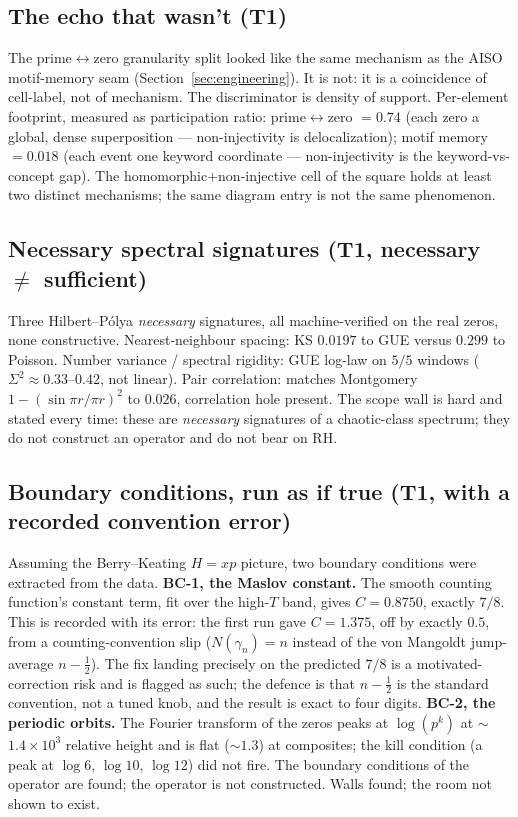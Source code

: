 \documentclass[11pt,a4paper]{article}
\newcommand{\TT}{\textsf{T1}}
\theoremstyle{definition}
\theoremstyle{plain}
\begin{document}
\subsection{The echo that wasn't (\TT)}
The prime$\leftrightarrow$zero granularity split looked like the same mechanism as the AISO
motif-memory seam (Section~\ref{sec:engineering}). It is not: it is a coincidence of cell-label,
not of mechanism. The discriminator is density of support. Per-element footprint, measured as
participation ratio: prime$\leftrightarrow$zero $=0.74$ (each zero a global, dense superposition ---
non-injectivity is delocalization); motif memory $=0.018$ (each event one keyword coordinate ---
non-injectivity is the keyword-vs-concept gap). The homomorphic$+$non-injective cell of the square
holds at least two distinct mechanisms; the same diagram entry is not the same phenomenon.

\subsection{Necessary spectral signatures (\TT, necessary $\ne$ sufficient)}
Three Hilbert--P\'olya \emph{necessary} signatures, all machine-verified on the real zeros, none
constructive. Nearest-neighbour spacing: KS $0.0197$ to GUE versus $0.299$ to Poisson. Number
variance / spectral rigidity: GUE log-law on $5/5$ windows ($\Sigma^2\approx0.33$--$0.42$, not
linear). Pair correlation: matches Montgomery $1-(\sin\pi r/\pi r)^2$ to $0.026$, correlation hole
present. The scope wall is hard and stated every time: these are \emph{necessary} signatures of a
chaotic-class spectrum; they do not construct an operator and do not bear on RH.

\subsection{Boundary conditions, run as if true (\TT, with a recorded convention error)}
Assuming the Berry--Keating $H=xp$ picture, two boundary conditions were extracted from the data.
\textbf{BC-1, the Maslov constant.} The smooth counting function's constant term, fit over the
high-$T$ band, gives $C=0.8750$, exactly $7/8$. This is recorded with its error: the first run gave
$C=1.375$, off by exactly $0.5$, from a counting-convention slip ($N(\gamma_n)=n$ instead of the
von Mangoldt jump-average $n-\tfrac12$). The fix landing precisely on the predicted $7/8$ is a
motivated-correction risk and is flagged as such; the defence is that $n-\tfrac12$ is the standard
convention, not a tuned knob, and the result is exact to four digits. \textbf{BC-2, the periodic
orbits.} The Fourier transform of the zeros peaks at $\log(p^k)$ at $\sim$$1.4\times10^3$ relative
height and is flat ($\sim$$1.3$) at composites; the kill condition (a peak at $\log 6$, $\log 10$,
$\log 12$) did not fire. The boundary conditions of the operator are found; the operator is not
constructed. Walls found; the room not shown to exist.
\end{document}

